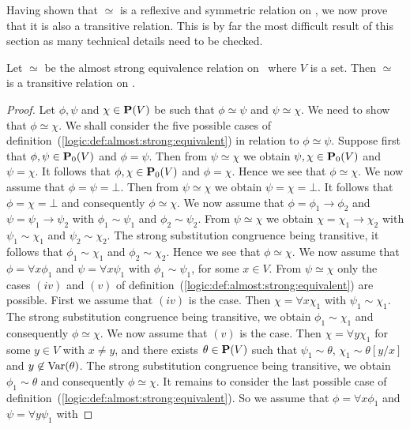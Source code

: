 Having shown that $\simeq$ is a reflexive and symmetric relation on
\pv, we now prove that it is also a transitive relation. This is by
far the most difficult result of this section as many technical
details need to be checked.

\begin{prop}\label{logic:prop:almost:strong:transitive}
Let $\simeq$ be the almost strong equivalence relation on \pv\ where
$V$ is a set. Then $\simeq$ is a transitive relation on \pv.
\end{prop}
\begin{proof}
Let $\phi,\psi$ and $\chi\in\mbox{${\bf P}(V)$}$ be such that $\phi\simeq\psi$ and
$\psi\simeq\chi$. We need to show that $\phi\simeq\chi$. We shall
consider the five possible cases of
definition~(\ref{logic:def:almost:strong:equivalent}) in relation to
$\phi\simeq\psi$. Suppose first that $\phi,\psi\in\mbox{${\bf P}_{0}(V)$}$ and
$\phi=\psi$. Then from $\psi\simeq\chi$ we obtain $\psi,\chi\in\mbox{${\bf P}_{0}(V)$}$
and $\psi=\chi$. It follows that $\phi,\chi\in\mbox{${\bf P}_{0}(V)$}$ and $\phi=\chi$.
Hence we see that $\phi\simeq\chi$. We now assume that
$\phi=\psi=\bot$. Then from $\psi\simeq\chi$ we obtain
$\psi=\chi=\bot$. It follows that $\phi=\chi=\bot$ and consequently
$\phi\simeq\chi$. We now assume that $\phi=\phi_{1}\to\phi_{2}$ and
$\psi=\psi_{1}\to\psi_{2}$ with $\phi_{1}\sim\psi_{1}$ and
$\phi_{2}\sim\psi_{2}$. From $\psi\simeq\chi$ we obtain
$\chi=\chi_{1}\to\chi_{2}$ with $\psi_{1}\sim\chi_{1}$ and
$\psi_{2}\sim\chi_{2}$. The strong substitution congruence being
transitive, it follows that $\phi_{1}\sim\chi_{1}$ and
$\phi_{2}\sim\chi_{2}$. Hence we see that $\phi\simeq\chi$. We now
assume that $\phi=\forall x\phi_{1}$ and $\psi=\forall x\psi_{1}$
with $\phi_{1}\sim\psi_{1}$, for some $x\in V$. From
$\psi\simeq\chi$ only the cases $(iv)$ and $(v)$ of
definition~(\ref{logic:def:almost:strong:equivalent}) are possible.
First we assume that $(iv)$ is the case. Then $\chi=\forall
x\chi_{1}$ with $\psi_{1}\sim\chi_{1}$. The strong substitution
congruence being transitive, we obtain $\phi_{1}\sim\chi_{1}$ and
consequently $\phi\simeq\chi$. We now assume that $(v)$ is the case.
Then $\chi=\forall y\chi_{1}$ for some $y\in V$ with $x\neq y$, and
there exists $\theta\in\mbox{${\bf P}(V)$}$ such that $\psi_{1}\sim\theta$,
$\chi_{1}\sim\theta[y/x]$ and $y\not\in\mbox{\rm Var}(\theta)$. The strong
substitution congruence being transitive, we obtain
$\phi_{1}\sim\theta$ and consequently $\phi\simeq\chi$. It remains
to consider the last possible case of
definition~(\ref{logic:def:almost:strong:equivalent}). So we assume
that $\phi=\forall x\phi_{1}$ and $\psi=\forall y\psi_{1}$ with

\end{proof}
